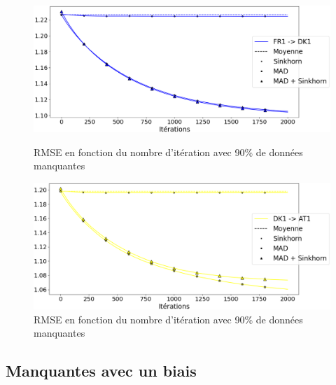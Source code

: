 \documentclass[acmsmall, natbib=false, nonacm]{acmart}
\begin{document}
\begin{figure}[H]
    \begin{minipage}[b]{0.4\linewidth}
		\centering \includegraphics[scale=0.14]{images/90_ar_DK1.png}
		\caption{RMSE en fonction du nombre d'itération avec 90\% de données manquantes}
	\end{minipage}\hfill
	\begin{minipage}[b]{0.4\linewidth}	
		\centering \includegraphics[scale=0.14]{images/90_ar_AT1.png}
		\caption{RMSE en fonction du nombre d'itération avec 90\% de données manquantes}
	\end{minipage}
\end{figure}

\subsection{Manquantes avec un biais}
\end{document}
